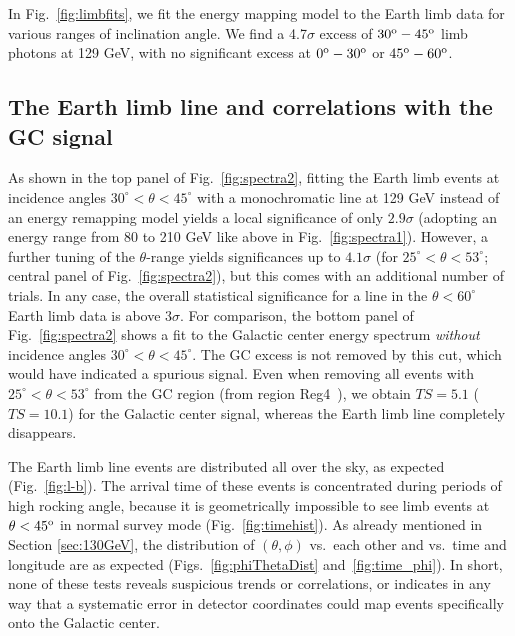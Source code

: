 \documentclass[aps,twocolumn,prd,superscriptaddress,showpacs,nofootinbib,fixfloat]{revtex4}
\newcommand{\degree}{^{\rm o}}
\begin{document}

In Fig.~\ref{fig:limbfits}, we fit the energy mapping model
to the Earth limb data for various ranges of inclination
angle. We find a 4.7$\sigma$ excess of $30\degree-45\degree$
limb photons at 129 GeV, with no significant excess at $0\degree - 30\degree$
or $45\degree - 60\degree$. 

\subsection{The Earth limb line and correlations with the GC signal}

As shown in the top panel of Fig.~\ref{fig:spectra2},
fitting the Earth limb events at
incidence angles $30^\circ<\theta<45^\circ$ with a
monochromatic line at 129 GeV instead of an energy remapping model yields a
local significance of only
$2.9\sigma$ (adopting an energy range from 80 to 210 GeV like above in
Fig.~\ref{fig:spectra1}).
However, a further tuning of the $\theta$-range yields significances up to $4.1\sigma$
(for $25^\circ<\theta<53^\circ$; central panel of Fig.~\ref{fig:spectra2}), 
but this comes with an additional number of trials.
In any case, the overall statistical
significance for a line in the $\theta<60^\circ$ Earth limb data is 
above $3\sigma$. 
For comparison, the bottom panel of Fig.~\ref{fig:spectra2} shows a fit to the Galactic center energy
spectrum \emph{without} incidence angles $30^\circ<\theta<45^\circ$. The GC
excess is not removed by this cut, which would have indicated a spurious
signal.  
Even when removing all events with
$25^\circ<\theta<53^\circ$ from the GC region (from region Reg4~\cite{Weniger:2012}),
we obtain $TS=5.1$ ($TS=10.1$) for the Galactic center signal, whereas the
Earth limb line completely disappears.

The Earth limb line events are distributed all over the sky, as expected
(Fig.~\ref{fig:l-b}).  The arrival time of these events is concentrated during
periods of high rocking angle, because it is geometrically impossible to see
limb
events at $\theta <45\degree$ in normal survey mode (Fig.~\ref{fig:timehist}).
As already mentioned in Section \ref{sec:130GeV}, the distribution of
$(\theta,\phi)$ vs.~each other and vs.~time and longitude are as expected
(Figs.~\ref{fig:phiThetaDist} and~\ref{fig:time_phi}).  In short, none of
these tests reveals suspicious trends or correlations, or indicates in any way that
a systematic error in detector coordinates could map events specifically onto
the Galactic center.
\end{document}
